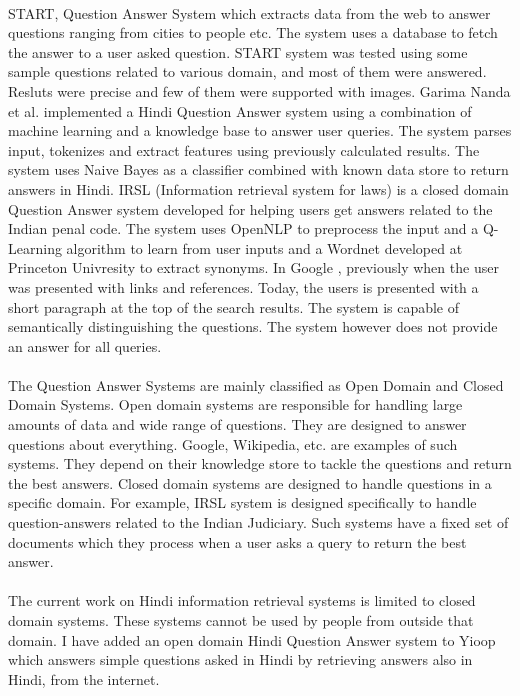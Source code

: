 \paragraph{}
START, Question Answer System \cite{katz1997annotating} which extracts data from the web to answer questions ranging from cities to people etc. The system uses a database to fetch the answer to a user asked question. START system was tested using some sample questions related to various domain, and most of them were answered. Resluts were precise and few of them were supported with images. Garima Nanda et al. implemented a Hindi Question Answer system \cite{nanda2016Hindi} using a combination of machine learning and a knowledge base to answer user queries. The system parses input, tokenizes and extract features using previously calculated results. The system uses  Naive Bayes as a classifier combined with known data store to return answers in Hindi. IRSL (Information retrieval system for laws) \cite {sangeetha2017information} is a closed domain Question Answer system developed for helping users get answers related to the Indian penal code. The system uses OpenNLP to preprocess the input and a Q-Learning algorithm to learn from user inputs and a Wordnet developed at Princeton Univresity to extract synonyms. In Google \cite {alupului2016question}, previously when the user was presented with links and references. Today, the users is presented with a short paragraph at the top of the search results. The system is capable of semantically distinguishing the questions. The system however does not provide an answer for all queries. 

\paragraph{}
The Question Answer Systems are mainly classified as Open Domain and Closed Domain Systems. 
Open domain systems are responsible for handling large amounts of data and wide range of questions. They are designed to answer questions about everything. Google, Wikipedia, etc. are examples of such systems. They depend on their knowledge store to tackle the questions and return the best answers.
Closed domain systems are designed to handle questions in a specific domain. For example, IRSL system is designed specifically to handle question-answers related to the Indian Judiciary. Such systems have a fixed set of documents which they process when a user asks a query to return the best answer.

\paragraph{}
The current work on Hindi information retrieval systems is limited to closed domain systems. These systems cannot be used by people from outside that domain. I have added an open domain Hindi Question Answer system to Yioop which answers simple questions asked in Hindi by retrieving answers also in Hindi, from the internet. 

